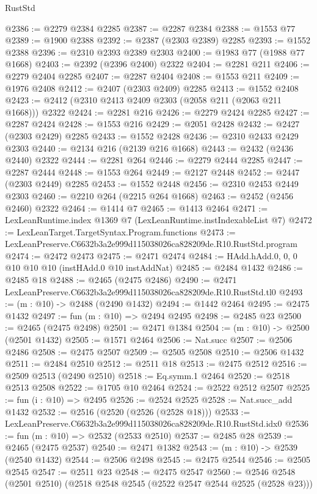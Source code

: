 \begin{lexlean}{RustStd}
\begin{coremodule}
@2386 := @2279 @2384 @2285
@2387 := @2287 @2384
@2388 := @1553 @77
@2389 := @1900 @2388
@2392 := @2387 (@2303 @2389) @2285
@2393 := @1552 @2388
@2396 := @2310 @2393 @2389 @2303
@2400 := @1983 @77 (@1988 @77 @1668)
@2403 := @2392 (@2396 @2400) @2322
@2404 := @2281 @211
@2406 := @2279 @2404 @2285
@2407 := @2287 @2404
@2408 := @1553 @211
@2409 := @1976 @2408
@2412 := @2407 (@2303 @2409) @2285
@2413 := @1552 @2408
@2423 := @2412 (@2310 @2413 @2409 @2303 (@2058 @211 (@2063 @211 @1668))) @2322
@2424 := @2281 @216
@2426 := @2279 @2424 @2285
@2427 := @2287 @2424
@2428 := @1553 @216
@2429 := @2051 @2428
@2432 := @2427 (@2303 @2429) @2285
@2433 := @1552 @2428
@2436 := @2310 @2433 @2429 @2303
@2440 := @2134 @216 (@2139 @216 @1668)
@2443 := @2432 (@2436 @2440) @2322
@2444 := @2281 @264
@2446 := @2279 @2444 @2285
@2447 := @2287 @2444
@2448 := @1553 @264
@2449 := @2127 @2448
@2452 := @2447 (@2303 @2449) @2285
@2453 := @1552 @2448
@2456 := @2310 @2453 @2449 @2303
@2460 := @2210 @264 (@2215 @264 @1668)
@2463 := @2452 (@2456 @2460) @2322
@2464 := @1414 @7
@2465 := @1413 @2464
@2471 := LexLeanRuntime.index @1369 @7 (LexLeanRuntime.instIndexableList @7)
@2472 := LexLeanTarget.TargetSyntax.Program.functions
@2473 := LexLeanPreserve.C6632b3a2e999d115038026ca828209de.R10.RustStd.program
@2474 := @2472 @2473
@2475 := @2471 @2474
@2484 := HAdd.hAdd.{0, 0, 0} @10 @10 @10 (instHAdd.{0} @10 instAddNat)
@2485 := @2484 @1432
@2486 := @2485 @18
@2488 := @2465 (@2475 @2486)
@2490 := @2471 LexLeanPreserve.C6632b3a2e999d115038026ca828209de.R10.RustStd.tl0
@2493 := (m : @10) -> @2488 (@2490 @1432)
@2494 := @1442 @2464
@2495 := @2475 @1432
@2497 := fun (m : @10) => @2494 @2495
@2498 := @2485 @23
@2500 := @2465 (@2475 @2498)
@2501 := @2471 @1384
@2504 := (m : @10) -> @2500 (@2501 @1432)
@2505 := @1571 @2464
@2506 := Nat.succ
@2507 := @2506 @2486
@2508 := @2475 @2507
@2509 := @2505 @2508
@2510 := @2506 @1432
@2511 := @2484 @2510
@2512 := @2511 @18
@2513 := @2475 @2512
@2516 := @2509 @2513 (@2490 @2510)
@2518 := Eq.symm.{1} @2464
@2520 := @2518 @2513 @2508
@2522 := @1705 @10 @2464
@2524 := @2522 @2512 @2507
@2525 := fun (i : @10) => @2495
@2526 := @2524 @2525
@2528 := Nat.succ_add @1432
@2532 := @2516 (@2520 (@2526 (@2528 @18)))
@2533 := LexLeanPreserve.C6632b3a2e999d115038026ca828209de.R10.RustStd.idx0
@2536 := fun (m : @10) => @2532 (@2533 @2510)
@2537 := @2485 @28
@2539 := @2465 (@2475 @2537)
@2540 := @2471 @1382
@2543 := (m : @10) -> @2539 (@2540 @1432)
@2544 := @2506 @2498
@2545 := @2475 @2544
@2546 := @2505 @2545
@2547 := @2511 @23
@2548 := @2475 @2547
@2560 := @2546 @2548 (@2501 @2510) (@2518 @2548 @2545 (@2522 @2547 @2544 @2525 (@2528 @23)))

\end{coremodule}
\end{lexlean}
